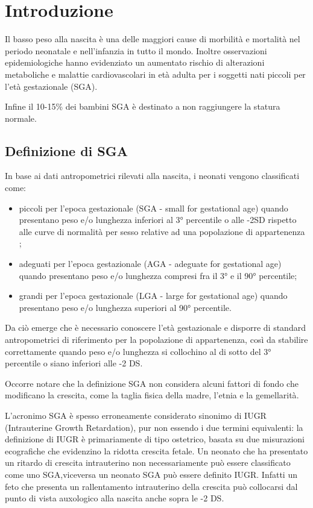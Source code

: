 \mainmatter

\chapter{Introduzione}
 
Il basso peso alla nascita \`e una delle maggiori cause di morbilit\`a e mortalit\`a
nel periodo neonatale e nell'infanzia in tutto il mondo.
Inoltre osservazioni epidemiologiche hanno evidenziato un aumentato rischio di 
alterazioni metaboliche e malattie cardiovascolari in età adulta per i soggetti nati piccoli 
per l'et\`a gestazionale (SGA)\cite{consensus}.

Infine il 10-15\% dei bambini SGA è destinato a non raggiungere la statura normale\cite{sga}.

\section{Definizione di SGA}

In base ai dati antropometrici rilevati alla nascita, i neonati vengono classificati come:
\begin{itemize}
\item piccoli per l'epoca gestazionale (SGA - small for gestational age) quando presentano peso e/o lunghezza inferiori al 3°
   percentile o alle -2SD rispetto alle curve di normalità per sesso relative ad una popolazione di appartenenza ;
\item adeguati per l'epoca gestazionale (AGA - adeguate for gestational age) quando presentano peso e/o lunghezza compresi
   fra il 3° e il 90° percentile;
\item grandi per l'epoca gestazionale (LGA - large for gestational age) quando presentano peso e/o lunghezza superiori
   al 90° percentile\cite{sga-1}.
\end{itemize}

Da ciò emerge che è necessario conoscere l'età gestazionale e disporre di standard antropometrici di riferimento per la popolazione di appartenenza, così da stabilire correttamente quando peso e/o lunghezza si collochino al di sotto del 3° percentile o siano inferiori alle -2 DS.

 Occorre notare che la definizione SGA non considera alcuni fattori di fondo che modificano la crescita, come la taglia fisica della madre,
l'etnia e la gemellarit\`a\cite{consensus}.

L'acronimo SGA è spesso erroneamente considerato sinonimo di IUGR (Intrauterine Growth Retardation), pur non essendo i due termini
equivalenti: la definizione di IUGR è primariamente di tipo ostetrico, basata su due misurazioni ecografiche che evidenzino la ridotta crescita fetale.
Un neonato che ha presentato un ritardo di crescita intrauterino non necessariamente pu\`o essere classificato come uno SGA,viceversa un
neonato SGA pu\`o essere definito IUGR. Infatti un feto che presenta un rallentamento intrauterino della crescita può collocarsi dal punto di vista 
auxologico alla nascita anche sopra le -2 DS\cite{sga}.

